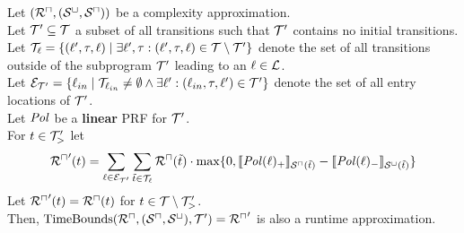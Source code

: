 \begin{theorem}[TimeBounds]
  Let $({\mathcal{R}^\sqcap}, {({\mathcal{S}^\sqcup}, {\mathcal{S}^\sqcap})})$ be a complexity approximation. \\
  Let $\mathcal{T}' \subseteq \mathcal{T}$ a subset of all transitions such that $\mathcal{T}'$ contains no initial transitions. \\
  Let $\mathcal{T}_{\ell} = \lbrace (\ell', \tau, \ell) \mid \exists \ell', \tau: (\ell', \tau, \ell) \in \mathcal{T} \setminus \mathcal{T}' \rbrace$ denote the set of all transitions outside of the subprogram $\mathcal{T}'$ leading to an $\ell \in \mathcal{L}$. \\
  Let $\mathcal{E}_{\mathcal{T}'} = \lbrace \ell_{in} \mid \mathcal{T}_{\ell_{in}} \neq \emptyset \wedge \exists \ell': (\ell_{in}, \tau, \ell') \in \mathcal{T}' \rbrace$ denote the set of all entry locations of $\mathcal{T}'$. \\
  Let $\mathit{Pol}$ be a \textbf{linear} PRF for $\mathcal{T}'$. \\
  For $t \in \mathcal{T}'_>$ let
  \[ {\mathcal{R}^\sqcap}'(t) = \sum_{\ell \in \mathcal{E}_{\mathcal{T}'}} \sum_{\tilde{t} \in \mathcal{T}_\ell} {\mathcal{R}^\sqcap}(\tilde{t}) \cdot \max \lbrace 0, \llbracket \mathit{Pol}(\ell)_+ \rrbracket_{{\mathcal{S}^\sqcap}(\tilde{t})} - \llbracket \mathit{Pol}(\ell)_- \rrbracket_{{\mathcal{S}^\sqcup}(\tilde{t})} \rbrace \]
  Let ${\mathcal{R}^\sqcap}'(t) = {\mathcal{R}^\sqcap}(t)$ for $t \in \mathcal{T} \setminus \mathcal{T}'_>$. \\
  Then, $\text{TimeBounds}({\mathcal{R}^\sqcap}, ({\mathcal{S}^\sqcap}, {\mathcal{S}^\sqcup}), \mathcal{T}') = {\mathcal{R}^\sqcap}'$ is also a runtime approximation.
\end{theorem}

